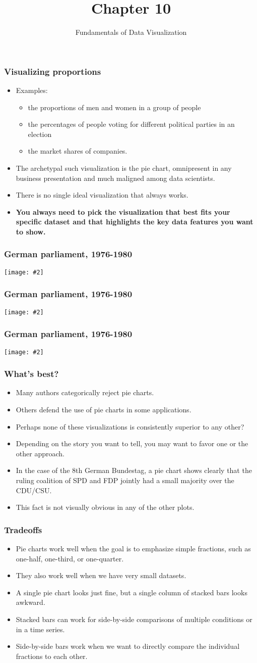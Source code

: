 \documentclass{beamer}
\author{Fundamentals of Data Visualization}
\title{Chapter 10}
\newcommand{\bi}{\begin{itemize}}
\newcommand{\li}{\item}
\newcommand{\ei}{\end{itemize}}
\newcommand{\fig}[2]{\centerline{\texttt{[image: \#2]}}}
\newcommand{\bfr}[1]{\begin{frame}[fragile]\frametitle{{ #1 }}}
\begin{document}
\begin{frame}
\maketitle
\end{frame}

\bfr{Visualizing proportions}
\bi
\li Examples:
\bi
\li the proportions of men and women in a group of people
\li the percentages of people voting for different political parties in an election
\li the market shares of companies.
\ei
\li The archetypal such visualization is the pie chart, omnipresent in any business presentation and much maligned among data scientists.
\li There is no single ideal visualization that always works.
\li \bf You always need to pick the visualization that best fits your specific dataset and that highlights the key data features you want to show.
\ei
\end{frame}

\bfr{German parliament, 1976-1980}
\fig{1}{bundestag-pie-1.png}
\end{frame}



\bfr{German parliament, 1976-1980}
\fig{1}{bundestag-stacked-bars-1.png}
\end{frame}
\bfr{German parliament, 1976-1980}
\fig{.8}{bundestag-bars-side-by-side-1.png}
\end{frame}

\bfr{What's best?}
\bi
\li Many authors categorically reject pie charts.
\li Others defend the use of pie charts in some applications. 
\li Perhaps none of these visualizations is consistently superior to any other?
\li  Depending on the  story you want to tell, you may want to favor one or the other approach.
\li  In the case of the 8th German Bundestag, a pie chart shows clearly that the ruling coalition of SPD and FDP jointly had a small majority over the CDU/CSU.
\li This fact is not visually obvious in any of the other plots.
\ei
\end{frame}

\bfr{Tradeoffs}
\bi
\li Pie charts work well when the goal is to emphasize simple fractions, such as one-half, one-third, or one-quarter.
\li They also work well when we have very small datasets.
\li A single pie chart looks just fine, but a single column of stacked bars looks awkward.
\li Stacked bars can work for side-by-side comparisons of multiple conditions or in a time series.
\li Side-by-side bars work when we want to directly compare the individual fractions to each other.
\ei
\end{frame}
\end{document}
